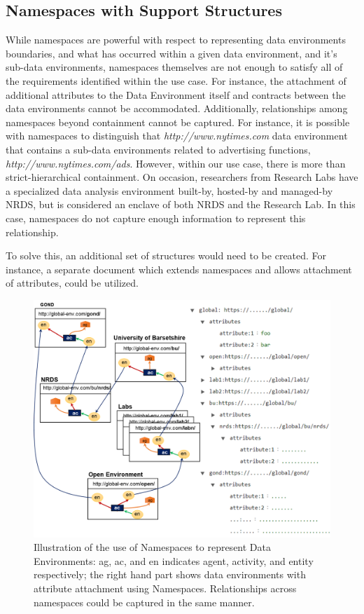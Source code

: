 \subsection{Namespaces with Support Structures} \label{subsec:namespacesplus}
While namespaces are powerful with respect to representing data environments boundaries, and what has occurred within a given data environment, and it's sub-data environments, namespaces themselves are not enough to satisfy all of the requirements identified within the use case. For instance, the attachment of additional attributes to the Data Environment itself and contracts between the data environments  cannot be accommodated. Additionally, relationships among namespaces beyond containment cannot be captured. For instance, it is possible with namespaces to distinguish that \textit{ http://www.nytimes.com}  data environment that contains a sub-data environments related to advertising functions, \textit{http://www.nytimes.com/ads}. However, within our use case, there is more than strict-hierarchical containment. On occasion, researchers from Research Labs have a specialized data analysis environment built-by, hosted-by and managed-by NRDS, but is considered an enclave of both NRDS and the Research Lab. In this case, namespaces do not capture enough information to represent this relationship.

To solve this, an additional set of structures would need to be created. For instance, a separate document which extends namespaces and allows attachment of attributes, could be utilized. 

\begin{figure}[!htbp]
\includegraphics[width=\textwidth]{namespaces-2.png}
\caption{Illustration of the use of Namespaces to represent Data Environments: ag, ac, and en indicates agent, activity, and entity respectively; the right hand part  shows data environments with attribute attachment using Namespaces. Relationships across namespaces could be captured in the same manner. } \label{fig:namespaces}
\end{figure}

